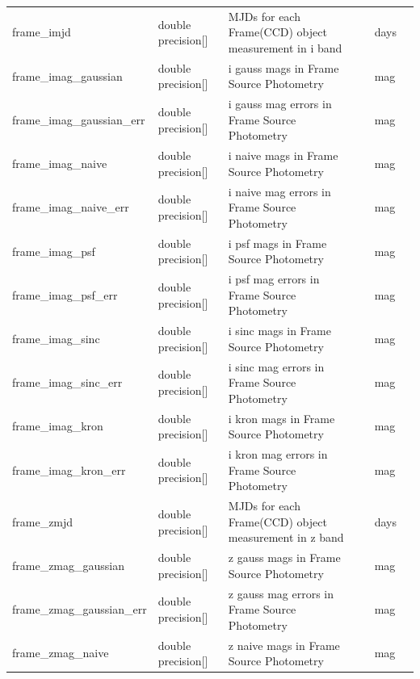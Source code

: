 \documentclass[12pt]{article}
\begin{document}
\begin{table}[thbp]
\begin{center}
{\begin{tabular}{llllll}
frame\_imjd & double precision[] & MJDs for each Frame(CCD) object measurement in i band     &                        & days            &   \\
frame\_imag\_gaussian & double precision[] & i gauss mags in Frame Source Photometry          &                        & mag            &   \\
frame\_imag\_gaussian\_err & double precision[] & i gauss mag errors in Frame Source Photometry          &                        & mag            &   \\
frame\_imag\_naive & double precision[] & i naive mags in Frame Source Photometry          &                        & mag            &   \\
frame\_imag\_naive\_err & double precision[] & i naive mag errors in Frame Source Photometry          &                        & mag            &   \\
frame\_imag\_psf & double precision[] & i psf mags in Frame Source Photometry          &                        & mag            &   \\
frame\_imag\_psf\_err & double precision[] & i psf mag errors in Frame Source Photometry          &                        & mag            &   \\
frame\_imag\_sinc & double precision[] & i sinc mags in Frame Source Photometry          &                        & mag            &   \\
frame\_imag\_sinc\_err & double precision[] & i sinc mag errors in Frame Source Photometry          &                        & mag            &   \\
frame\_imag\_kron & double precision[] & i kron mags in Frame Source Photometry          &                        & mag            &   \\
frame\_imag\_kron\_err & double precision[] & i kron mag errors in Frame Source Photometry          &                        & mag            &   \\
frame\_zmjd & double precision[] & MJDs for each Frame(CCD) object measurement in z band     &                        & days            &   \\
frame\_zmag\_gaussian & double precision[] & z gauss mags in Frame Source Photometry          &                        & mag            &   \\
frame\_zmag\_gaussian\_err & double precision[] & z gauss mag errors in Frame Source Photometry          &                        & mag            &   \\
frame\_zmag\_naive & double precision[] & z naive mags in Frame Source Photometry          &                        & mag            &   \\

\end{tabular}}
\end{center}
\end{table}
\end{document}
